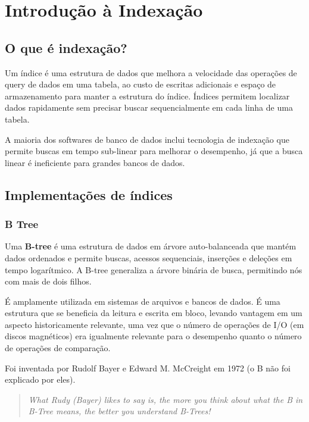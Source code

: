 \chapter{Introdução à Indexação}

\section{O que é indexação?}

Um índice é uma estrutura de dados que melhora a velocidade das operações de query de dados em uma tabela, ao custo de escritas adicionais e espaço de armazenamento para manter a estrutura do índice. Índices permitem localizar dados rapidamente sem precisar buscar sequencialmente em cada linha de uma tabela.

A maioria dos softwares de banco de dados inclui tecnologia de indexação que permite buscas em tempo sub-linear para melhorar o desempenho, já que a busca linear é ineficiente para grandes bancos de dados.

\cite{databaseindex:wiki}

\section{Implementações de índices}

\subsection{B Tree}

Uma \textbf{B-tree} é uma estrutura de dados em árvore auto-balanceada que mantém dados ordenados e permite buscas, acessos sequenciais, inserções e deleções em tempo logarítmico. A B-tree generaliza a árvore binária de busca, permitindo nós com mais de dois filhos.

É amplamente utilizada em sistemas de arquivos e bancos de dados. É uma estrutura que se beneficia da leitura e escrita em bloco, levando vantagem em um aspecto historicamente relevante, uma vez que o número de operações de I/O (em discos magnéticos) era igualmente relevante para o desempenho quanto o número de operações de comparação.

Foi inventada por Rudolf Bayer e Edward M. McCreight em 1972 (o B não foi explicado por eles).

\begin{quotation}
    \it What Rudy (Bayer) likes to say is, the more you think about what the B in B-Tree means, the better you understand B-Trees!
\end{quotation}

